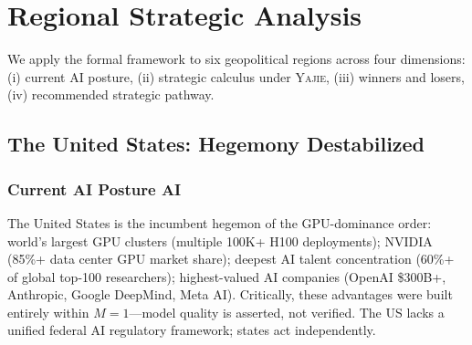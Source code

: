 \documentclass[11pt,a4paper]{article}
\theoremstyle{definition}
\theoremstyle{remark}
\newcommand{\Yajie}{\textsc{Yajie}}
\newcommand{\MAone}{M=1}
\begin{document}
\section{Regional Strategic Analysis}
We apply the formal framework to six geopolitical regions across four dimensions: (i) current AI posture, (ii) strategic calculus under \Yajie{}, (iii) winners and losers, (iv) recommended strategic pathway.
\subsection{The United States: Hegemony Destabilized}
\label{sec:us}
\subsubsection{Current AI Posture AI}
The United States is the incumbent hegemon of the GPU-dominance order: world's largest GPU clusters (multiple 100K+ H100 deployments); NVIDIA (85\%+ data center GPU market share); deepest AI talent concentration (60\%+ of global top-100 researchers); highest-valued AI companies (OpenAI \$300B+, Anthropic, Google DeepMind, Meta AI). Critically, these advantages were built entirely within $\MAone$---model quality is asserted, not verified. The US lacks a unified federal AI regulatory framework; states act independently.
\end{document}
